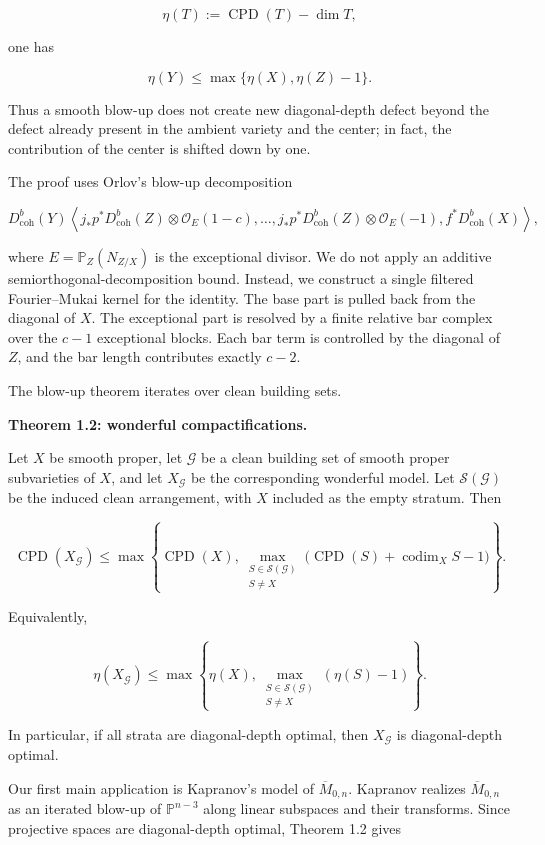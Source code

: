 \documentclass[11pt]{amsart}
\theoremstyle{definition}
\begin{document}
\[
\eta(T):=\operatorname{CPD}(T)-\dim T,
\]

one has

\[
\eta(Y)\le \max\{\eta(X),\eta(Z)-1\}.
\]

Thus a smooth blow-up does not create new diagonal-depth defect beyond the defect already present in the ambient variety and the center; in fact, the contribution of the center is shifted down by one.

The proof uses Orlov's blow-up decomposition

\[
D^b_{\mathrm{coh}}(Y)
\left\langle
j_*p^*D^b_{\mathrm{coh}}(Z)\otimes \mathcal O_E(1-c),
\dots,
j_*p^*D^b_{\mathrm{coh}}(Z)\otimes \mathcal O_E(-1),
f^*D^b_{\mathrm{coh}}(X)
\right\rangle,
\]

where $E=\mathbb P_Z(N_{Z/X})$ is the exceptional divisor. We do not apply an additive semiorthogonal-decomposition bound. Instead, we construct a single filtered Fourier--Mukai kernel for the identity. The base part is pulled back from the diagonal of $X$. The exceptional part is resolved by a finite relative bar complex over the $c-1$ exceptional blocks. Each bar term is controlled by the diagonal of $Z$, and the bar length contributes exactly $c-2$.

The blow-up theorem iterates over clean building sets.

\noindent\textbf{Theorem 1.2: wonderful compactifications.}

Let $X$ be smooth proper, let $\mathcal G$ be a clean building set of smooth proper subvarieties of $X$, and let $X_{\mathcal G}$ be the corresponding wonderful model. Let $\mathcal S(\mathcal G)$ be the induced clean arrangement, with $X$ included as the empty stratum. Then

\[
\operatorname{CPD}(X_{\mathcal G})
\le
\max\left\{
\operatorname{CPD}(X),
\max_{\substack{S\in\mathcal S(\mathcal G)\\ S\ne X}}
\bigl(
\operatorname{CPD}(S)+\operatorname{codim}_XS-1
\bigr)
\right\}.
\]

Equivalently,

\[
\eta(X_{\mathcal G})
\le
\max\left\{
\eta(X),
\max_{\substack{S\in\mathcal S(\mathcal G)\\ S\ne X}}
(\eta(S)-1)
\right\}.
\]

In particular, if all strata are diagonal-depth optimal, then $X_{\mathcal G}$ is diagonal-depth optimal.

Our first main application is Kapranov's model of $\overline M_{0,n}$. Kapranov realizes $\overline M_{0,n}$ as an iterated blow-up of $\mathbb P^{n-3}$ along linear subspaces and their transforms. Since projective spaces are diagonal-depth optimal, Theorem 1.2 gives
\end{document}
